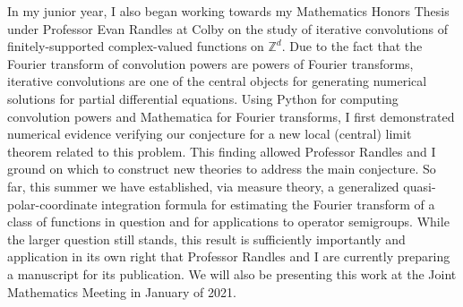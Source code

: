 \documentclass[12pt]{article}
\begin{document}
In my junior year, I also began working towards my Mathematics Honors Thesis under Professor Evan Randles at Colby on the study of iterative convolutions of finitely-supported complex-valued functions on $\mathbb{Z}^d$. Due to the fact that the Fourier transform of convolution powers are powers of Fourier transforms, iterative convolutions are one of the central objects for generating numerical solutions for partial differential equations. Using Python for computing convolution powers and Mathematica for Fourier transforms, I first demonstrated numerical evidence verifying our conjecture for a new local (central) limit theorem related to this problem. This finding allowed Professor Randles and I ground on which to construct new theories to address the main conjecture. So far, this summer we have established, via measure theory, a generalized quasi-polar-coordinate integration formula for estimating the Fourier transform of a class of functions in question and for applications to operator semigroups. While the larger question still stands, this result is sufficiently importantly and application in its own right that Professor Randles and I are currently preparing a manuscript for its publication. We will also be presenting this work at the Joint Mathematics Meeting in January of 2021. 











 


	
	
	
	
	
	
	






 

















	
	
	
	
	
\end{document}
